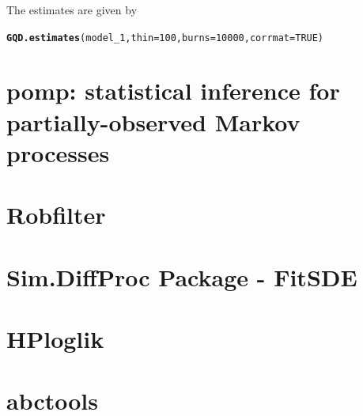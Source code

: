 \documentclass[a4paper,11pt]{article}\usepackage[]{graphicx}\usepackage[]{color}
\makeatletter
\newcommand{\hlnum}[1]{\textcolor[rgb]{0.686,0.059,0.569}{#1}}%
\newcommand{\hlstd}[1]{\textcolor[rgb]{0.345,0.345,0.345}{#1}}%
\newcommand{\hlkwc}[1]{\textcolor[rgb]{0.333,0.667,0.333}{#1}}%
\newcommand{\hlkwd}[1]{\textcolor[rgb]{0.737,0.353,0.396}{\textbf{#1}}}%
\newenvironment{kframe}{%
 \def\at@end@of@kframe{}%
 \ifinner\ifhmode%
  \def\at@end@of@kframe{\end{minipage}}%
  \begin{minipage}{\columnwidth}%
 \fi\fi%
 \def\FrameCommand##1{\hskip\@totalleftmargin \hskip-\fboxsep
 \colorbox{shadecolor}{##1}\hskip-\fboxsep
     \hskip-\linewidth \hskip-\@totalleftmargin \hskip\columnwidth}%
 \MakeFramed {\advance\hsize-\width
   \@totalleftmargin\z@ \linewidth\hsize
   \@setminipage}}%
 {\par\unskip\endMakeFramed%
 \at@end@of@kframe}
\newenvironment{knitrout}{}{} %
\makeatother
\begin{document}


The estimates are given by

\begin{knitrout}
\color{fgcolor}\begin{kframe}
\begin{alltt}
\hlkwd{GQD.estimates}\hlstd{(model_1,} \hlkwc{thin} \hlstd{=} \hlnum{100}\hlstd{,} \hlkwc{burns} \hlstd{=} \hlnum{10000}\hlstd{,} \hlkwc{corrmat} \hlstd{=} \hlnum{TRUE}\hlstd{)}
\end{alltt}
\end{kframe}
\end{knitrout}




\section{pomp: statistical inference for partially-observed Markov processes}
\section{Robfilter}
\section{Sim.DiffProc Package - FitSDE}
\section{HPloglik}
\section{abctools}
\end{document}
